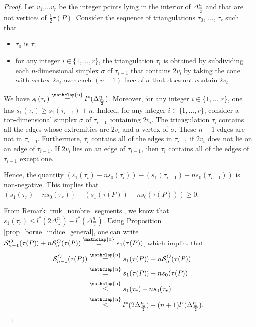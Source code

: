 \documentclass[12pt]{article}
\newcommand\customeq{\stackrel{\mathclap{\normalfont\scriptsize\mbox{n}}}{=}}
\newcommand\customleq{\stackrel{\mathclap{\normalfont\scriptsize\mbox{n}}}{\leq}}
\theoremstyle{definition}
\begin{document}
\begin{proof}
    Let $v_1$,...$v_r$ be the integer points lying in the interior of $\Delta_{\frac{m}{2}}^n$ and that are not vertices of $\frac{1}{2}\tau(P)$. Consider the sequence of triangulations $\tau_0$, ..., $\tau_r$ such that 
    \begin{itemize}
        \item $\tau_0$ is $\tau$;
        \item for any integer $i\in \{1,...,r\}$, the triangulation $\tau_i$ is obtained by subdividing each $n$-dimensional simplex $\sigma$ of $\tau_{i-1}$ that contains $2v_i$ by taking the cone with vertex $2v_i$ over each $(n-1)$-face of $\sigma$ that does not contain $2v_i$.
    \end{itemize}
    We have $s_0(\tau_r) \customeq l^*(\Delta_{\frac{m}{2}}^n)$. Moreover, for any integer $i \in \{1,...,r \}$, one has $s_1(\tau_{i}) \geq s_1(\tau_{i-1}) + n$.
    Indeed, for any integer $i \in \{1,...,r \}$, consider a top-dimensional simplex $\sigma$ of $\tau_{i-1}$ containing $2v_i$. The triangulation $\tau_i$ contains all the edges whose extremities are $2v_i$ and a vertex of $\sigma$. These $n+1$ edges are not in $\tau_{i-1}$. Furthermore, $\tau_i$ contains all of the edges in $\tau_{i-1}$ if $2v_i$ does not lie on an edge of $\tau_{i-1}$. If $2v_i$ lies on an edge of $\tau_{i-1}$, then $\tau_i$ contains all of the edges of $\tau_{i-1}$ except one.
    
    Hence, the quantity $\left(s_1(\tau_i)-ns_0(\tau_i)\right) - \left(s_1(\tau_{i-1})-ns_0(\tau_{i-1})\right)$ is non-negative. This implies that $\left(s_1(\tau_r)-ns_0(\tau_r)\right) - \left(s_1(\tau(P))-ns_0(\tau(P))\right) \geq 0$.

    From Remark \ref{rmk_nombre_segments}, we know that $s_1(\tau_r) \leq l^*(2\Delta_{\frac{m}{2}}^n) - l^*(\Delta_{\frac{m}{2}}^n)$.
    Using Proposition \ref{prop_borne_indice_general}, one can write $\mathcal{S}_{n-1}^O(\tau(P)) + n\mathcal{S}_{n}^O(\tau(P)) \customeq s_1(\tau(P))$,
    which implies that
    \begin{align*}
        \mathcal{S}_{n-1}^O(\tau(P)) & \customeq s_1(\tau(P)) - n\mathcal{S}_{n}^O(\tau(P))\\ 
        &\customeq s_1(\tau(P)) - ns_0(\tau(P)) \\
        &\customleq s_1(\tau_r) - ns_0(\tau_r) \\
        &\customleq l^*(2\Delta_{\frac{m}{2}}^n) - (n+1) l^*(\Delta_{\frac{m}{2}}^n).
    \end{align*}
\end{proof}
\end{document}
